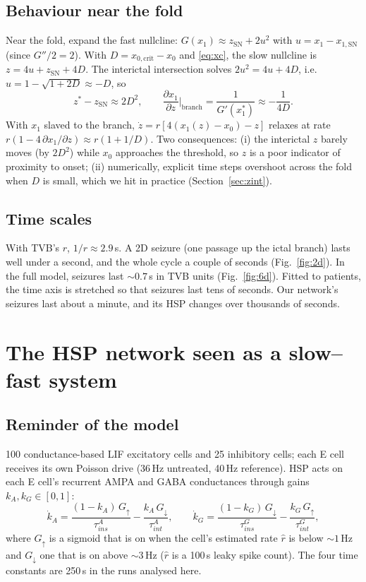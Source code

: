 \documentclass[11pt]{article}
\newcommand{\kA}{k_A}
\newcommand{\kG}{k_G}
\newcommand{\xc}{x_{0,\mathrm{crit}}}
\newcommand{\zsn}{z_{\mathrm{SN}}}
\newcommand{\xsn}{x_{1,\mathrm{SN}}}
\begin{document}
\subsection{Behaviour near the fold}\label{sec:nearfold}
Near the fold, expand the fast nullcline: $G(x_1) \approx \zsn + 2u^2$ with $u = x_1 - \xsn$ (since $G''/2 = 2$).
With $D = \xc - x_0$ and \eqref{eq:xc}, the slow nullcline is $z = 4u + \zsn + 4D$. The interictal intersection solves
$2u^2 = 4u + 4D$, i.e.\ $u = 1 - \sqrt{1+2D} \approx -D$, so
\begin{equation}
z^* - \zsn \approx 2D^2,\qquad \frac{\partial x_1}{\partial z}\Big|_{\text{branch}} = \frac{1}{G'(x_1^*)} \approx -\frac{1}{4D}.
\end{equation}
With $x_1$ slaved to the branch, $\dot z = r[4(x_1(z) - x_0) - z]$ relaxes at rate $r(1 - 4\,\partial x_1/\partial z)
\approx r(1 + 1/D)$. Two consequences: (i) the interictal $z$ barely moves (by $2D^2$) while $x_0$ approaches the threshold,
so $z$ is a poor indicator of proximity to onset; (ii) numerically, explicit time steps overshoot across the fold when
$D$ is small, which we hit in practice (Section~\ref{sec:zint}).

\subsection{Time scales}\label{sec:timescales}
With TVB's $r$, $1/r\approx2.9$\,s. A 2D seizure (one passage up the ictal branch) lasts well under a second, and the
whole cycle a couple of seconds (Fig.~\ref{fig:2d}). In the full model, seizures last $\sim0.7$\,s in TVB units
(Fig.~\ref{fig:6d}). Fitted to patients, the time axis is stretched so that seizures last tens of seconds.
Our network's seizures last about a minute, and its HSP changes over thousands of seconds.

\section{The HSP network seen as a slow--fast system}
\subsection{Reminder of the model}
100 conductance-based LIF excitatory cells and 25 inhibitory cells; each E cell receives its own Poisson drive
(36\,Hz untreated, 40\,Hz reference). HSP acts on each E cell's recurrent AMPA and GABA conductances through
gains $\kA,\kG\in[0,1]$:
\[
\dot \kA = \frac{(1-\kA)\,G_\uparrow}{\tau^{A}_{ins}} - \frac{\kA\,G_\downarrow}{\tau^{A}_{int}},\qquad
\dot \kG = \frac{(1-\kG)\,G_\downarrow}{\tau^{G}_{ins}} - \frac{\kG\,G_\uparrow}{\tau^{G}_{int}},
\]
where $G_\uparrow$ is a sigmoid that is on when the cell's estimated rate $\hat r$ is below $\sim1$\,Hz and
$G_\downarrow$ one that is on above $\sim3$\,Hz ($\hat r$ is a 100\,s leaky spike count). The four time constants are
250\,s in the runs analysed here.
\end{document}
